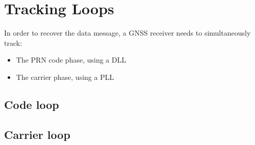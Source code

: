 \section{Tracking Loops}
In order to recover the data message, a \ac{GNSS} receiver needs to simultaneously track:

\begin{itemize}
\item{The \ac{PRN} code phase, using a \ac{DLL}} 
\item{The carrier phase, using a \ac{PLL}}
\end{itemize}

\subsection{Code loop}

\subsection{Carrier loop}

